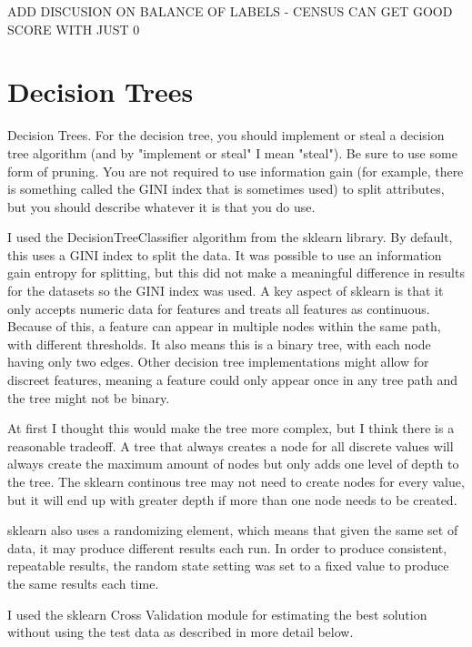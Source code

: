 \documentclass[letterpaper]{article} %
\begin{document}
ADD DISCUSION ON BALANCE OF LABELS - CENSUS CAN GET GOOD SCORE WITH JUST 0

\section{Decision Trees}
Decision Trees. For the decision tree, you should implement or steal a decision tree algorithm (and by "implement or steal" I mean "steal"). Be sure to use some form of pruning. You are not required to use information gain (for example, there is something called the GINI index that is sometimes used) to split attributes, but you should describe whatever it is that you do use.

I used the DecisionTreeClassifier algorithm from the sklearn library.  By default, this uses a GINI index to split the data.  It was possible to use an information gain entropy for splitting, but this did not make a meaningful difference in results for the datasets so the GINI index was used.  A key aspect of sklearn is that it only accepts numeric data for features and treats all features as continuous.  Because of this, a feature can appear in multiple nodes within the same path, with different thresholds.  It also means this is a binary tree, with each node having only two edges.  Other decision tree implementations might allow for discreet features, meaning a feature could only appear once in any tree path and the tree might not be binary.  

At first I thought this would make the tree more complex, but I think there is a reasonable tradeoff.  A tree that always creates a node for all discrete values will always create the maximum amount of nodes but only adds one level of depth to the tree.  The sklearn continous tree may not need to create nodes for every value, but it will end up with greater depth if more than one node needs to be created.  

sklearn also uses a randomizing element, which means that given the same set of data, it may produce different results each run.  In order to produce consistent, repeatable results, the random state setting was set to a fixed value to produce the same results each time.

I used the sklearn Cross Validation module for estimating the best solution without using the test data as described in more detail below.
\end{document}
